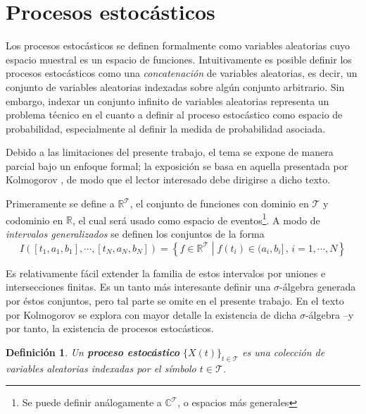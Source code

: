 \documentclass[12pt,letterpaper]{book}
\newtheorem{definicion}{Definición}[chapter]
\newcommand{\R}{\mathbb{R}}
\newcommand{\C}{\mathbb{C}}
\newcommand{\xt}{$\{X(t)\}_{t\in \mathcal{T}}$ }
\newcommand{\talque}{\mathrel{}\middle|\mathrel{}}
\begin{document}

\section{Procesos estocásticos}

Los procesos estocásticos se definen formalmente como variables aleatorias cuyo espacio muestral es un espacio de funciones.
%
Intuitivamente es posible definir %
los procesos estocásticos como una \textit{concatenación} de variables aleatorias, es decir, un conjunto de variables aleatorias indexadas sobre algún conjunto arbitrario.
%
Sin embargo, indexar un conjunto infinito de variables aleatorias representa un problema técnico en el cuanto a definir al proceso estocástico como espacio de probabilidad, especialmente al definir la medida de probabilidad asociada.

Debido a las limitaciones del presente trabajo, el tema se expone de manera parcial bajo un enfoque formal; la exposición se basa en aquella presentada por Kolmogorov \cite{kolmogorov2018foundations},
 de modo que el lector interesado debe dirigirse a dicho texto.

Primeramente se define a $\R^{\mathcal{T}}$, el conjunto de funciones con dominio en $\mathcal{T}$ y codominio en $\R$, el cual será usado como espacio de eventos\footnote{Se puede definir análogamente a $\C^{\mathcal{T}}$, o espacios más generales}. 
%
A modo de \textit{intervalos generalizados} se definen los conjuntos de la forma
\begin{equation}
I\left( [t_1, a_1, b_1], \cdots, [t_N, a_N, b_N] \right) = 
\left\{ f \in \R^{\mathcal{T}} \talque f(t_i) \in (a_i, b_i] \, , \, i = 1, \cdots, N \right\}
\end{equation}

Es relativamente fácil extender la familia de estos intervalos por uniones e intersecciones finitas. %
Es un tanto más interesante definir una $\sigma$-álgebra generada por éstos conjuntos, pero tal parte se omite en el presente trabajo.
%
En el texto por Kolmogorov se explora con mayor detalle la existencia de dicha $\sigma$-álgebra --y por tanto, la existencia de procesos estocásticos.

\begin{definicion}
Un \textbf{proceso estocástico} \xt es una colección de variables aleatorias indexadas por el símbolo $t\in\mathcal{T}$.
\end{definicion}
\end{document}
